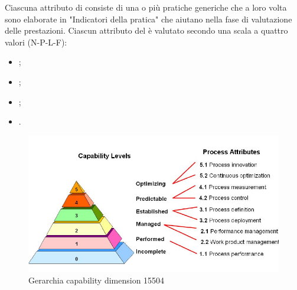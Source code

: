 Ciascuna attributo di  consiste di una o più pratiche generiche che a loro volta sono elaborate in "Indicatori della pratica" che aiutano nella fase di valutazione delle prestazioni.
Ciascun attributo del  è valutato secondo una scala a quattro valori (N-P-L-F):
\begin{itemize}
	\item {};
	\item {};
	\item {};
	\item {}.
\end{itemize}
\begin{figure}[h]
	\includegraphics[width=1\textwidth]{../includes/pics/ISO_15504.png}
	\caption{Gerarchia capability dimension  15504}
\end{figure}
